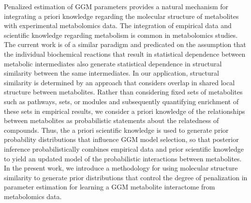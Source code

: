 \begin{DoubleSpace*}
Penalized estimation of GGM parameters provides a natural mechanism for integrating a priori knowledge regarding the molecular structure of metabolites with experimental metabolomics data. The integration of empirical data and scientific knowledge regarding metabolism is common in metabolomics studies. The current work is of a similar paradigm and predicated on the assumption that the individual biochemical reactions that result in statistical dependence between metabolic intermediates also generate statistical dependence in structural similarity between the same intermediates. In our application, structural similarity is determined by an approach that considers overlap in shared local structure between metabolites. Rather than considering fixed sets of metabolites such as pathways, sets, or modules and subsequently quantifying enrichment of these sets in empirical results, we consider a priori knowledge of the relationships between metabolites as probabilistic statements about the relatedness of compounds. Thus, the a priori scientific knowledge is used to generate prior probability distributions that influence GGM model selection, so that posterior inference probabilistically combines empirical data and prior scientific knowledge to yield an updated model of the probabilistic interactions between metabolites. In the present work, we introduce a methodology for using molecular structure similarity to generate prior distributions that control the degree of penalization in parameter estimation for learning a GGM metabolite interactome from metabolomics data. 
\end{DoubleSpace*}